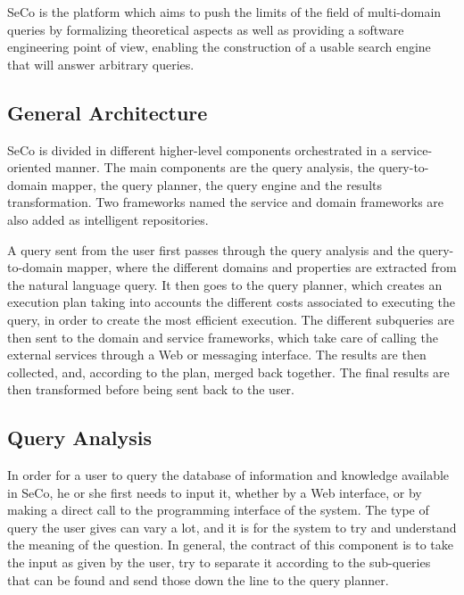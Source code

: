 SeCo is the platform which aims to push the limits of the field of multi-domain queries by formalizing theoretical aspects as well as providing a software engineering point of view, enabling the construction of a usable search engine that will answer arbitrary queries.

\subsection{General Architecture} %
\label{sub:general_architecture}

SeCo is divided in different higher-level components orchestrated in a service-oriented manner. The main components are the query analysis, the query-to-domain mapper, the query planner, the query engine and the results transformation. Two frameworks named the service and domain frameworks are also added as intelligent repositories.

A query sent from the user first passes through the query analysis and the query-to-domain mapper, where the different domains and properties are extracted from the natural language query. It then goes to the query planner, which creates an execution plan taking into accounts the different costs associated to executing the query, in order to create the most efficient execution. The different subqueries are then sent to the domain and service frameworks, which take care of calling the external services through a Web or messaging interface. The results are then collected, and, according to the plan, merged back together. The final results are then transformed before being sent back to the user.


\subsection{Query Analysis} %
\label{sub:query_analysis}

In order for a user to query the database of information and knowledge available in SeCo, he or she first needs to input it, whether by a Web interface, or by making a direct call to the programming interface of the system. The type of query the user gives can vary a lot, and it is for the system to try and understand the meaning of the question. In general, the contract of this component is to take the input as given by the user, try to separate it according to the sub-queries that can be found and send those down the line to the query planner.

